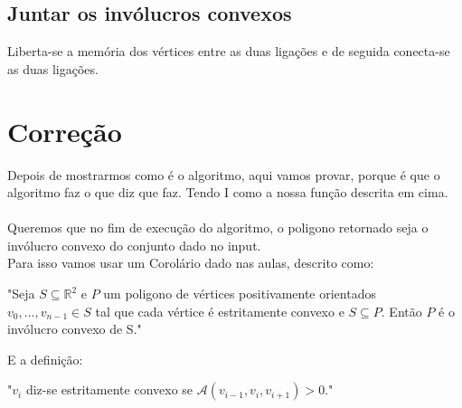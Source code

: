 \documentclass[11pt]{article}
\begin{document}
\subsection{ Juntar os invólucros convexos } 
Liberta-se a memória dos vértices entre as duas ligações e de seguida 
conecta-se as duas ligações.


\section{Correção}
Depois de mostrarmos como é o algoritmo,
aqui vamos provar, porque é que o algoritmo faz o que diz que faz.
Tendo I como a nossa função descrita em cima.\\
\\
Queremos que no fim de execução do algoritmo, o poligono
retornado seja o invólucro convexo do conjunto dado 
no input.\\
Para isso vamos usar um Corolário dado nas aulas, descrito como:

\begin{center}
    "Seja $S \subseteq \mathbb{R}^2$ e $P$ um poligono de vértices 
    positivamente orientados $v_0,...,v_{n-1} \in S$ tal que cada
    vértice é estritamente convexo e $S \subseteq P$. Então $P$ é
    o invólucro convexo de S."
\end{center}
E a definição:

\begin{center}
    "$v_i$ diz-se estritamente convexo se $\mathcal{A}(v_{i-1},v_i,v_{i+1}) > 0$."
\end{center}
\end{document}
